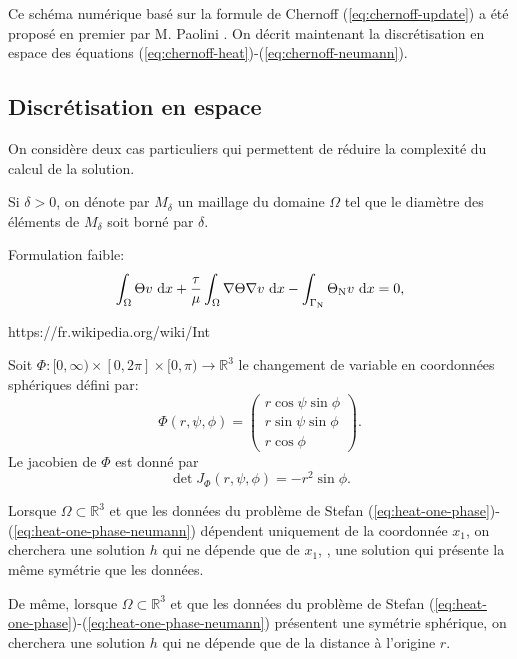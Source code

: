 Ce schéma numérique basé sur la formule de Chernoff
(\ref{eq:chernoff-update}) a été proposé en premier par M. Paolini
\cite{Paolini1988}. On décrit maintenant la discrétisation en
espace des équations (\ref{eq:chernoff-heat})-(\ref{eq:chernoff-neumann}).


\subsection*{Discrétisation en espace}
On considère deux cas particuliers qui permettent de réduire
la complexité du calcul de la solution.

Si $\delta > 0$, on dénote par $M_\delta$ un maillage du domaine
$\Omega$ tel que le diamètre des éléments de $M_\delta$ soit borné par
$\delta$.

Formulation faible:
\begin{equation}
  \int_\Omega \temperature v\,\intd{x} + \frac{\tau}{\mu} %
  \int_\Omega \nabla \temperature \nabla v\,\intd{x} - %
  \int_{\Gamma_\mathrm{N}} \temperature_\mathrm{N}v\,\intd{x} %
  = 0,
\end{equation}

https://fr.wikipedia.org/wiki/Int%

Soit $\Phi:[0,\infty)\times[0,2\pi]\times[0,\pi)\to\mathbb R^3$ le
changement de variable en coordonnées sphériques défini par:
\begin{equation}
  \Phi(r, \psi, \phi) = \begin{pmatrix}
    r\cos\psi\sin\phi\\
    r\sin\psi\sin\phi\\
    r\cos\phi
  \end{pmatrix}.
\end{equation}
Le jacobien de $\Phi$ est donné par
\begin{equation}
  \det J_\Phi(r, \psi,\phi) = -r^2\sin\phi.
\end{equation}

Lorsque $\Omega \subset \mathbb R^3$ et que les données du
problème de Stefan
(\ref{eq:heat-one-phase})-(\ref{eq:heat-one-phase-neumann})
dépendent uniquement de la coordonnée $x_1$, on cherchera une solution
$h$ qui ne dépende que de $x_1$, \ie, une solution qui présente la
même symétrie que les données.

De même, lorsque $\Omega \subset \mathbb R^3$ et que les données du
problème de Stefan
(\ref{eq:heat-one-phase})-(\ref{eq:heat-one-phase-neumann})
présentent une symétrie sphérique, on cherchera une solution
$h$ qui ne dépende que de la distance à l'origine $r$.

